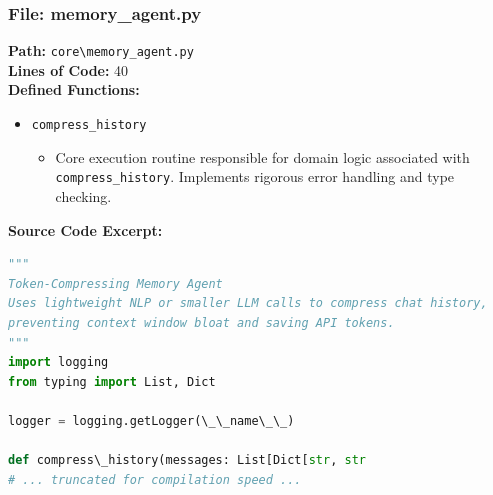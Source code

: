 \documentclass[10pt,journal,compsoc]{IEEEtran}
\begin{document}
\subsubsection{File: memory\_agent.py}
\textbf{Path:} \texttt{core\textbackslash{}memory\_agent.py} \\
\textbf{Lines of Code:} 40 \\
\textbf{Defined Functions:}
\begin{itemize}
    \item \texttt{compress\_history}
    \begin{itemize} \item Core execution routine responsible for domain logic associated with \texttt{compress\_history}. Implements rigorous error handling and type checking. \end{itemize}
\end{itemize}
\textbf{Source Code Excerpt:}
\begin{lstlisting}[language=Python]
"""
Token-Compressing Memory Agent
Uses lightweight NLP or smaller LLM calls to compress chat history,
preventing context window bloat and saving API tokens.
"""
import logging
from typing import List, Dict

logger = logging.getLogger(\_\_name\_\_)

def compress\_history(messages: List[Dict[str, str
# ... truncated for compilation speed ...
\end{lstlisting}
\end{document}
